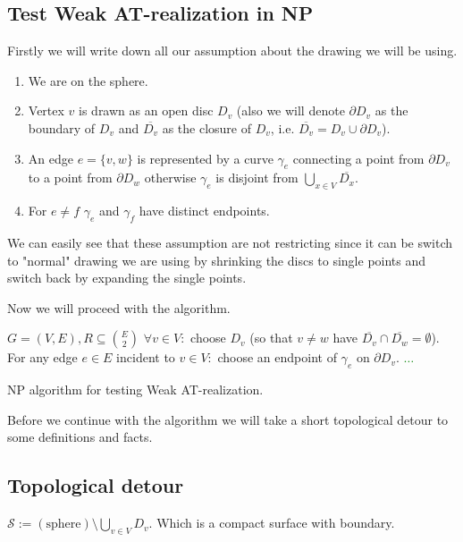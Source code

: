 \subsection{Test Weak AT-realization in NP}

Firstly we will write down all our assumption about the drawing we will be using.

\begin{enumerate}
	\item We are on the sphere.
	\item Vertex $v$ is drawn as an open disc $D_v$ (also we will denote $\partial D_v$ as the boundary of $D_v$ and $\overline{D_v}$ as the closure of $D_v$, i.e. $\overline{D_v} = D_v \cup \partial D_v$).
	\item An edge $e = \{v,w\}$ is represented by a curve $\gamma_e$ connecting a point from $\partial D_v$ to a point from $\partial D_w$ otherwise $\gamma_e$ is disjoint from $\bigcup_{x \in V} \overline{D_x}$.
	\item For $e \neq f$ $\gamma_e$ and $\gamma_f$ have distinct endpoints.
\end{enumerate}

We can easily see that these assumption are not restricting since it can be switch to "normal" drawing we are using by shrinking the discs to single points and switch back by expanding the single points.

Now we will proceed with the algorithm.

\begin{algorithm}[!ht]
	\begin{algorithmic}[1]
		\Require $G = (V,E), R \subseteq \binom{E}{2}$
		\State $\forall v \in V:$ choose $D_v$ (so that $v \neq w$ have $\overline{D_v} \cap \overline{D_w} = \emptyset$).
		\State For any edge $e \in E$ incident to $v \in V:$ choose an endpoint of $\gamma_e$ on $\partial D_v$.
		\State \textcolor{Green}{$\dots$}
	\end{algorithmic}
	\caption{NP algorithm for testing Weak AT-realization.}
\end{algorithm}

Before we continue with the algorithm we will take a short topological detour to some definitions and facts.

\subsection{Topological detour}

\begin{defn}
	$\mathcal{S} := (\text{sphere}) \setminus \bigcup_{v \in V} D_v$. Which is a compact surface with boundary.
\end{defn}

